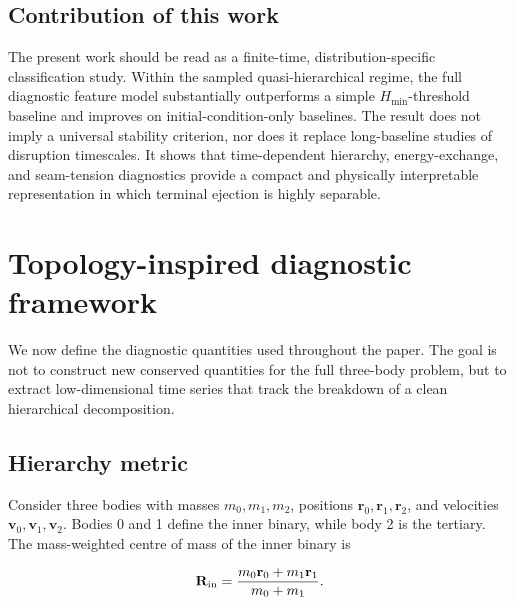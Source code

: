 \documentclass[12pt,a4paper]{article}
\newcommand{\Hmin}{H_{\min}}
\newcommand{\Rin}{\mathbf{R}_{\rm in}}
\begin{document}
\subsection{Contribution of this work}
\label{sec:related_contribution}

The present work should be read as a finite-time, distribution-specific classification study. Within the sampled quasi-hierarchical regime, the full diagnostic feature model substantially outperforms a simple \(\Hmin\)-threshold baseline and improves on initial-condition-only baselines. The result does not imply a universal stability criterion, nor does it replace long-baseline studies of disruption timescales. It shows that time-dependent hierarchy, energy-exchange, and seam-tension diagnostics provide a compact and physically interpretable representation in which terminal ejection is highly separable.

\section{Topology-inspired diagnostic framework}
\label{sec:diagnostics}

We now define the diagnostic quantities used throughout the paper. The goal is not to construct new conserved quantities for the full three-body problem, but to extract low-dimensional time series that track the breakdown of a clean hierarchical decomposition.

\subsection{Hierarchy metric}
\label{sec:H_metric}

Consider three bodies with masses \(m_0,m_1,m_2\), positions \(\mathbf r_0,\mathbf r_1,\mathbf r_2\), and velocities \(\mathbf v_0,\mathbf v_1,\mathbf v_2\). Bodies 0 and 1 define the inner binary, while body 2 is the tertiary. The mass-weighted centre of mass of the inner binary is

\begin{equation}
    \Rin =
    \frac{m_0\mathbf r_0 + m_1\mathbf r_1}{m_0+m_1}.
    \label{eq:inner_com}
\end{equation}
\end{document}
